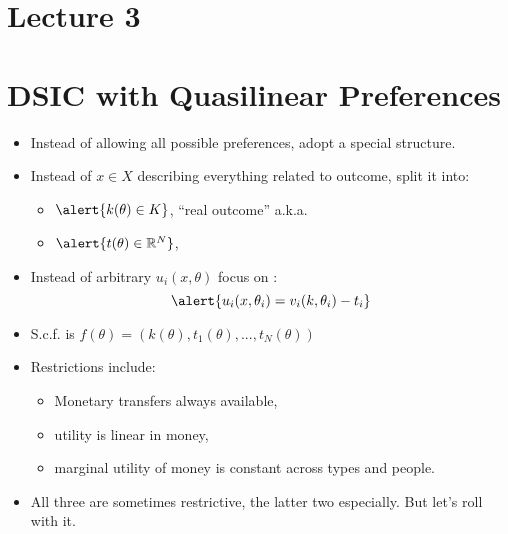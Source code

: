 \documentclass[english]{beamer}		%
\def\lyxframeend{} %
\begin{document}
\section{Lecture 3}

\section{DSIC with Quasilinear Preferences}


\begin{itemize}
	\item Instead of allowing all possible preferences, adopt a special structure.
	\item Instead of $x \in X$ describing everything related to outcome, split it into:
	\begin{itemize}
		\item $\alert{k(\theta) \in K}$, ``real outcome'' a.k.a. 
		\item $\alert{t(\theta) \in \mathbb{R}^N}$, 
	\end{itemize}
	\item Instead of arbitrary $u_i(x,\theta)$ focus on :
	$$\alert{ u_i(x,\theta_i) = v_i(k,\theta_i) - t_i }$$
	\pause\vspace{-1em}
	\item S.c.f. is $f(\theta) = \left( k(\theta), t_1(\theta), ..., t_N(\theta) \right)$
\end{itemize}
\vspace{-2em}
\lyxframeend


\begin{itemize}
	\item Restrictions include:
	\begin{itemize}
		\item Monetary transfers always available,
		\item utility is linear in money,
		\item marginal utility of money is constant across types and people.
	\end{itemize}
	\item All three are sometimes restrictive, the latter two especially. But let's roll with it.
\end{itemize}
\lyxframeend
\end{document}
